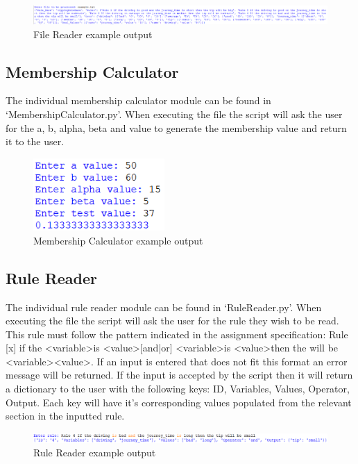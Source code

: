 \documentclass{article}
\begin{document}
\begin{figure}[H]
\includegraphics[width=12cm]{example1}
\caption{File Reader example output}
\end{figure}

\subsection{Membership Calculator}
The individual membership calculator module can be found in ‘MembershipCalculator.py’. When executing the file the script will ask the user for the a, b, alpha, beta and value to generate the membership value and return it to the user.  

\begin{figure}[H]
\centering
\includegraphics[width=5cm]{example2}
\caption{Membership Calculator example output}
\end{figure}

\subsection{Rule Reader}
The individual rule reader module can be found in ‘RuleReader.py’. When executing the file the script will ask the user for the rule they wish to be read. This rule must follow the pattern indicated in the assignment specification: Rule [x] if the \textless variable\textgreater is \textless value\textgreater [and|or] \textless variable\textgreater is \textless value\textgreater then the will be \textless variable\textgreater \textless value\textgreater. If an input is entered that does not fit this format an error message will be returned. If the input is accepted by the script then it will return a dictionary to the user with the following keys: ID, Variables, Values, Operator, Output. Each key will have it’s corresponding values populated from the relevant section in the inputted rule. 


\begin{figure}[H]
\includegraphics[width=12cm]{example3}
\caption{Rule Reader example output}
\end{figure}
\end{document}
